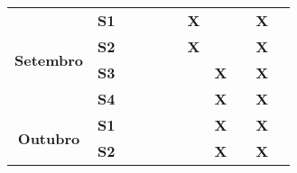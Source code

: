 \begin{table}[]
\begin{tabular}{|clllclllllllllll|}
\\ \hline
\multicolumn{4}{|c|}{\multirow{4}{*}{\textbf{Setembro}}} & \multicolumn{3}{c|}{\textbf{S1}}                      & \multicolumn{1}{l|}{\textbf{}}  & \multicolumn{1}{l|}{\textbf{}}  & \multicolumn{1}{l|}{\textbf{}}  & \multicolumn{1}{l|}{\textbf{}}  & \multicolumn{1}{l|}{\textbf{X}}  & \multicolumn{1}{l|}{\textbf{}} & \multicolumn{1}{l|}{\textbf{}}  & \multicolumn{1}{l|}{\textbf{X}}
\\ \cline{5-15} 
\multicolumn{4}{|c|}{}                                   & \multicolumn{3}{c|}{\textbf{S2}}                      & \multicolumn{1}{l|}{\textbf{}}  & \multicolumn{1}{l|}{\textbf{}}  & \multicolumn{1}{l|}{\textbf{}}  & \multicolumn{1}{l|}{\textbf{}} & \multicolumn{1}{l|}{\textbf{X}}  & \multicolumn{1}{l|}{\textbf{}}  & \multicolumn{1}{l|}{\textbf{}} & \multicolumn{1}{l|}{\textbf{X}}
\\ \cline{5-15} 
\multicolumn{4}{|c|}{}                                   & \multicolumn{3}{c|}{\textbf{S3}}                      & \multicolumn{1}{l|}{\textbf{}}  & \multicolumn{1}{l|}{\textbf{}}  & \multicolumn{1}{l|}{\textbf{}}  & \multicolumn{1}{l|}{\textbf{}} & \multicolumn{1}{l|}{\textbf{}}  & \multicolumn{1}{l|}{\textbf{X}}  & \multicolumn{1}{l|}{\textbf{}} & \multicolumn{1}{l|}{\textbf{X}}
\\ \cline{5-15} 
\multicolumn{4}{|c|}{}                                   & \multicolumn{3}{c|}{\textbf{S4}}                      & \multicolumn{1}{l|}{\textbf{}}  & \multicolumn{1}{l|}{\textbf{}}  & \multicolumn{1}{l|}{\textbf{}}  & \multicolumn{1}{l|}{\textbf{}}  & \multicolumn{1}{l|}{\textbf{}} & \multicolumn{1}{l|}{\textbf{X}}  & \multicolumn{1}{l|}{\textbf{}} & \multicolumn{1}{l|}{\textbf{X}}
\\ \hline
\multicolumn{4}{|c|}{\multirow{4}{*}{\textbf{Outubro}}}  & \multicolumn{3}{c|}{\textbf{S1}}                      & \multicolumn{1}{l|}{\textbf{}}  & \multicolumn{1}{l|}{\textbf{}}  & \multicolumn{1}{l|}{\textbf{}}  & \multicolumn{1}{l|}{\textbf{}}  & \multicolumn{1}{l|}{\textbf{}} & \multicolumn{1}{l|}{\textbf{X}}  & \multicolumn{1}{l|}{\textbf{}} & \multicolumn{1}{l|}{\textbf{X}}
\\ \cline{5-15} 
\multicolumn{4}{|c|}{}                                   & \multicolumn{3}{c|}{\textbf{S2}}                      & \multicolumn{1}{l|}{\textbf{}}  & \multicolumn{1}{l|}{\textbf{}}  & \multicolumn{1}{l|}{\textbf{}}  & \multicolumn{1}{l|}{\textbf{}}  & \multicolumn{1}{l|}{\textbf{}}  & \multicolumn{1}{l|}{\textbf{X}}  & \multicolumn{1}{l|}{\textbf{}} & \multicolumn{1}{l|}{\textbf{X}}

\end{tabular}
\end{table}
